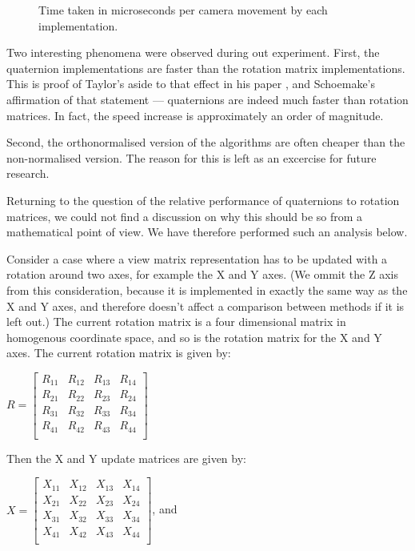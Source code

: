\documentclass{acm_proc_article-sp}
\begin{document}
\begin{figure}
\caption{Time taken in microseconds per camera movement by each implementation.}
\label{fig:performance-table}
\end{figure}

Two interesting phenomena were observed during out experiment.
First, the quaternion implementations are faster than the rotation matrix implementations.
This is proof of Taylor's aside to that effect in his paper \cite{taylor79}, and Schoemake's affirmation of that statement \cite{schoemake85} --- quaternions are indeed much faster than rotation matrices.
In fact, the speed increase is approximately an order of magnitude.

Second, the orthonormalised version of the algorithms are often cheaper than the non-normalised version.
The reason for this is left as an excercise for future research.

Returning to the question of the relative performance of quaternions to rotation matrices, we could not find a discussion on why this should be so from a mathematical point of view.
We have therefore performed such an analysis below.

Consider a case where a view matrix representation has to be updated with a rotation around two axes, for example the X and Y axes.
(We ommit the Z axis from this consideration, because it is implemented in exactly the same way as the X and Y axes, and therefore doesn't affect a comparison between methods if it is left out.)
The current rotation matrix is a four dimensional matrix in homogenous coordinate space, and so is the rotation matrix for the X and Y axes.
The current rotation matrix is given by:

$R = \left[ \begin{array}{cccc}
    R_{11} & R_{12} & R_{13} & R_{14} \\
    R_{21} & R_{22} & R_{23} & R_{24} \\
    R_{31} & R_{32} & R_{33} & R_{34} \\
    R_{41} & R_{42} & R_{43} & R_{44} \\
\end{array} \right]$

Then the X and Y update matrices are given by:

\vspace{0.5em}
$X = \left[ \begin{array}{cccc}
    X_{11} & X_{12} & X_{13} & X_{14} \\
    X_{21} & X_{22} & X_{23} & X_{24} \\
    X_{31} & X_{32} & X_{33} & X_{34} \\
    X_{41} & X_{42} & X_{43} & X_{44} \\
\end{array} \right]$, and
\end{document}
